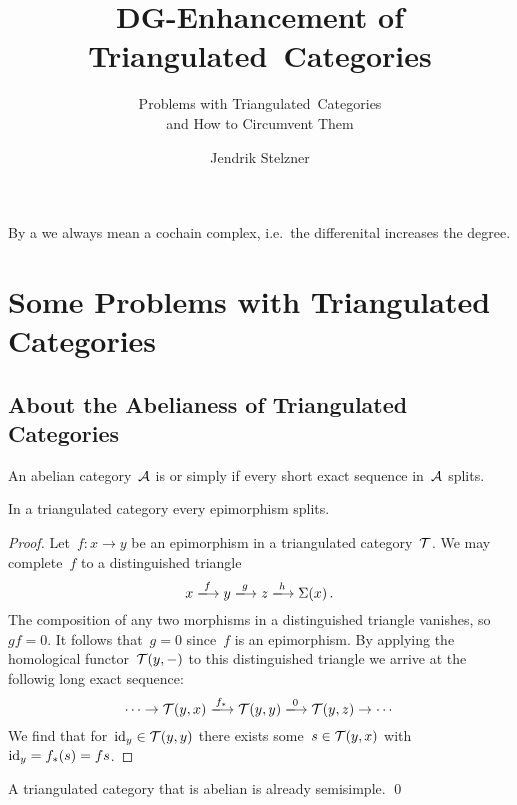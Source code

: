 \documentclass[a4paper,10pt]{scrartcl}
\title{DG-Enhancement of Triangulated~Categories}
\subtitle{Problems with Triangulated~Categories \\ and How to Circumvent Them}
\author{Jendrik Stelzner}
\date{}
\begin{document}
\maketitle

\vspace{-1em}





By a  we always mean a cochain complex, i.e.\ the differenital increases the degree.





\section{Some Problems with Triangulated Categories}



\subsection{About the Abelianess of Triangulated Categories}

\begin{definition}
  An abelian category~$\mathcal{A}$ is  or simply  if every short exact sequence in~$\mathcal{A}$ splits.
\end{definition}

\begin{lemma}
  In a triangulated category every epimorphism splits.
\end{lemma}

\begin{proof}
  Let~$f \colon x \to y$ be an epimorphism in a triangulated category~$\mathcal{T}$.
  We may complete~$f$ to a distinguished triangle
  \[
    x
    \xlongto{f}
    y
    \xlongto{g}
    z
    \xlongto{h}
    \Sigma(x) \,.
  \]
  The composition of any two morphisms in a distinguished triangle vanishes, so~$gf = 0$.
  It follows that~$g = 0$ since~$f$ is an epimorphism.
  By applying the homological functor~$\mathcal{T}(y,-)$ to this distinguished triangle we arrive at the followig long exact sequence:
  \[
    \dotsb
    \to
    \Tcat(y,x)
    \xlongto{f_*}
    \Tcat(y,y)
    \xlongto{0}
    \Tcat(y,z)
    \to
    \dotsb
  \]
  We find that for~$\mathrm{id}_y \in \mathcal{T}(y,y)$ there exists some~$s \in \mathcal{T}(y,x)$ with~$\mathrm{id}_y = f_*(s) = fs$.
\end{proof}

\begin{corollary}
  \label{triangulated abelian is semisimple}
  A triangulated category that is abelian is already semisimple.
  \qed
\end{corollary}
\end{document}
